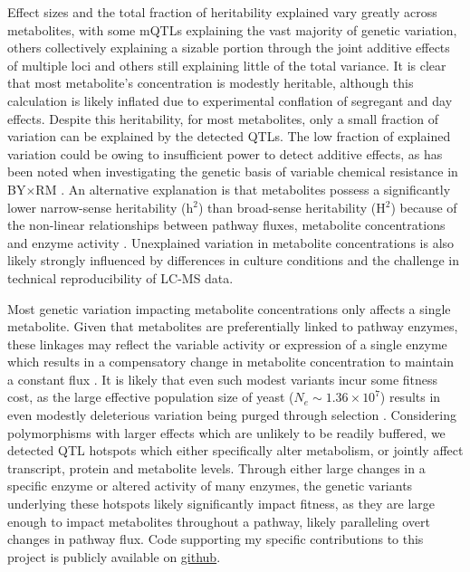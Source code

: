 Effect sizes and the total fraction of heritability explained vary greatly across metabolites, with some mQTLs explaining the vast majority of genetic variation, others collectively explaining a sizable portion through the joint additive effects of multiple loci and others still explaining little of the total variance.  It is clear that most metabolite's concentration is modestly heritable, although this calculation is likely inflated due to experimental conflation of segregant and day effects.  Despite this heritability, for most metabolites, only a small fraction of variation can be explained by the detected QTLs.  The low fraction of explained variation could be owing to insufficient power to detect additive effects, as has been noted when investigating the genetic basis of variable chemical resistance in BY$\times$RM \cite{Bloom:2013bq}.  An alternative explanation is that metabolites possess a significantly lower narrow-sense heritability (h$^{2}$) than broad-sense heritability (H$^{2}$) because of the non-linear relationships between pathway fluxes, metabolite concentrations and enzyme activity \cite{Kacser:1973fe, Rowe:2008ty}. Unexplained variation in metabolite concentrations is also likely strongly influenced by differences in culture conditions and the challenge in technical reproducibility of LC-MS data. 

Most genetic variation impacting metabolite concentrations only affects a single metabolite.  Given that metabolites are preferentially linked to pathway enzymes, these linkages may reflect the variable activity or expression of a single enzyme which results in a compensatory change in metabolite concentration to maintain a constant flux \cite{Fendt:2010gr}. It is likely that even such modest variants incur some fitness cost, as the large effective population size of yeast ($N_{e} \sim 1.36 \times 10^{7}$) results in even modestly deleterious variation being purged through selection \cite{Hartl:2007fy,Ohta:1973ub,Wagner:2005cn}. Considering polymorphisms with larger effects which are unlikely to be readily buffered, we detected QTL hotspots which either specifically alter metabolism, or jointly affect transcript, protein and metabolite levels.  Through either large changes in a specific enzyme or altered activity of many enzymes, the genetic variants underlying these hotspots likely significantly impact fitness, as they are large enough to impact metabolites throughout a pathway, likely paralleling overt changes in pathway flux. Code supporting my specific contributions to this project is publicly available on \href{https://github.com/shackett/mQTL}{github}.

